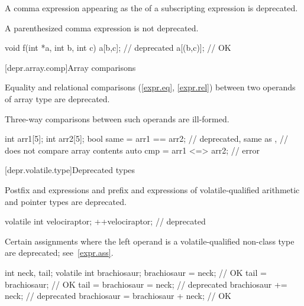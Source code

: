 \pnum
A comma expression
appearing as the 
of a subscripting expression is deprecated.
\begin{note}
A parenthesized comma expression is not deprecated.
\end{note}
\begin{example}
\begin{codeblock}
void f(int *a, int b, int c) {
    a[b,c];                     // deprecated
    a[(b,c)];                   // OK
}
\end{codeblock}
\end{example}

[depr.array.comp]{Array comparisons}

\pnum
Equality and relational comparisons (\ref{expr.eq}, \ref{expr.rel})
between two operands of array type
are deprecated.
\begin{note}
Three-way comparisons between such operands are ill-formed.
\end{note}
\begin{example}
\begin{codeblock}
int arr1[5];
int arr2[5];
bool same = arr1 == arr2;       // deprecated, same as ,
                                // does not compare array contents
auto cmp = arr1 <=> arr2;       // error
\end{codeblock}
\end{example}

[depr.volatile.type]{Deprecated  types}

\pnum
Postfix \tcode{++} and \tcode{--} expressions and
prefix \tcode{++} and \tcode{--} expressions
of volatile-qualified arithmetic and pointer types are deprecated.

\begin{example}
\begin{codeblock}
volatile int velociraptor;
++velociraptor;                     // deprecated
\end{codeblock}
\end{example}


\pnum
Certain assignments
where the left operand is a volatile-qualified non-class type
are deprecated; see~\ref{expr.ass}.

\begin{example}
\begin{codeblock}
int neck, tail;
volatile int brachiosaur;
brachiosaur = neck;                 // OK
tail = brachiosaur;                 // OK
tail = brachiosaur = neck;          // deprecated
brachiosaur += neck;                // deprecated
brachiosaur = brachiosaur + neck;   // OK
\end{codeblock}
\end{example}



